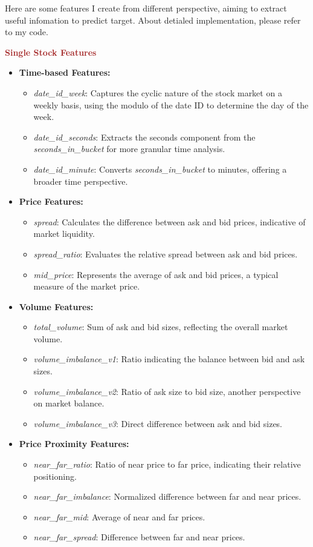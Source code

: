 \documentclass[12pt]{article}
\newtheorem{Proof of Lemma}{Proof of Lemma}
\begin{document}
Here are some features I create from different perspective, aiming to extract useful infomation to predict target. About detialed implementation, please refer to my code.

\noindent \textcolor{brown}{\textbf{Single Stock Features}}

\begin{itemize}
  \item \textbf{Time-based Features:}
  \begin{itemize}
  \item \textit{date\_id\_week}: Captures the cyclic nature of the stock market on a weekly basis, using the modulo of the date ID to determine the day of the week.
  \item \textit{date\_id\_seconds}: Extracts the seconds component from the \textit{seconds\_in\_bucket} for more granular time analysis.
  \item \textit{date\_id\_minute}: Converts \textit{seconds\_in\_bucket} to minutes, offering a broader time perspective.
  \end{itemize}
  
  \item \textbf{Price Features:}
  \begin{itemize}
  \item \textit{spread}: Calculates the difference between ask and bid prices, indicative of market liquidity.
  \item \textit{spread\_ratio}: Evaluates the relative spread between ask and bid prices.
  \item \textit{mid\_price}: Represents the average of ask and bid prices, a typical measure of the market price.
  \end{itemize}
  
  \item \textbf{Volume Features:}
  \begin{itemize}
  \item \textit{total\_volume}: Sum of ask and bid sizes, reflecting the overall market volume.
  \item \textit{volume\_imbalance\_v1}: Ratio indicating the balance between bid and ask sizes.
  \item \textit{volume\_imbalance\_v2}: Ratio of ask size to bid size, another perspective on market balance.
  \item \textit{volume\_imbalance\_v3}: Direct difference between ask and bid sizes.
  \end{itemize}
  
  \item \textbf{Price Proximity Features:}
  \begin{itemize}
  \item \textit{near\_far\_ratio}: Ratio of near price to far price, indicating their relative positioning.
  \item \textit{near\_far\_imbalance}: Normalized difference between far and near prices.
  \item \textit{near\_far\_mid}: Average of near and far prices.
  \item \textit{near\_far\_spread}: Difference between far and near prices.
  \end{itemize}
  

\end{itemize}
\end{document}
